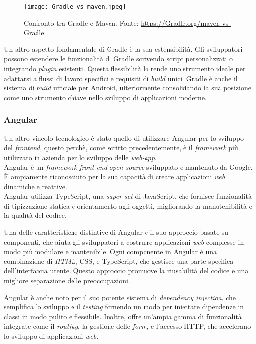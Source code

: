  \begin{figure}[!h] 
  \centering 
  \texttt{[image: Gradle-vs-maven.jpeg]} 
  \caption[Confronto tra Gradle e Maven]{Confronto tra Gradle e Maven. Fonte: \url{https://Gradle.org/maven-vs-Gradle}}
  \label{fig:gredle-vs-maven}
\end{figure}

Un altro aspetto fondamentale di Gradle è la sua estensibilità. Gli sviluppatori possono estendere le funzionalità di Gradle 
scrivendo script personalizzati o integrando \textit{plugin} esistenti. Questa flessibilità lo rende uno strumento ideale per adattarsi a 
flussi di lavoro specifici e requisiti di \textit{build} unici. Gradle è anche il sistema di \textit{build} ufficiale per Android, ulteriormente 
consolidando la sua posizione come uno strumento chiave nello sviluppo di applicazioni moderne.

\subsubsection*{Angular}
Un altro vincolo tecnologico è stato quello di utilizzare Angular per lo sviluppo del \textit{frontend}, 
questo perchè, come scritto precedentemente, è il \textit{framework} più utilizzato in azienda per lo sviluppo delle \textit{web-app}.\\

Angular è un \textit{framework} \textit{front-end} \textit{open source} sviluppato e mantenuto da Google. 
È ampiamente riconosciuto per la sua capacità di creare applicazioni \textit{web} dinamiche e reattive. \\
Angular utilizza TypeScript, una \textit{super-set} di JavaScript, che fornisce funzionalità di tipizzazione statica e 
orientamento agli oggetti, migliorando la manutenibilità e la qualità del codice.

Una delle caratteristiche distintive di Angular è il suo approccio basato su componenti, che aiuta gli sviluppatori a 
costruire applicazioni \textit{web} complesse in modo più modulare e mantenibile. Ogni componente in Angular è una combinazione di \textit{HTML}, 
CSS, e TypeScript, che gestisce una parte specifica dell'interfaccia utente. Questo approccio promuove la riusabilità 
del codice e una migliore separazione delle preoccupazioni.

Angular è anche noto per il suo potente sistema di \textit{dependency injection}, che semplifica lo sviluppo e il \textit{testing} fornendo un 
modo per iniettare dipendenze in classi in modo pulito e flessibile. Inoltre, offre un'ampia gamma di funzionalità integrate come il 
\textit{routing}, la gestione delle \textit{form}, e l'accesso HTTP, che accelerano lo sviluppo di applicazioni \textit{web}.


